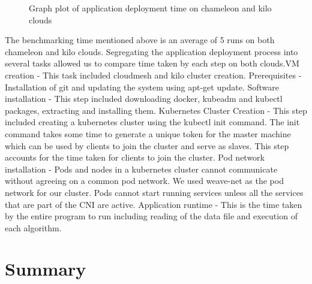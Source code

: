 \documentclass[9pt,twocolumn,twoside]{../../styles/osajnl}
\begin{document}
\begin{figure}[htbp]
\centering
{}
\caption{Graph plot of application deployment time on chameleon and kilo clouds}
\label{Graph plot of application deployment time on chameleon and kilo clouds}
\end{figure}

\noindent
The benchmarking time mentioned above is an average of 5 runs on both
chameleon and kilo clouds. Segregating the application deployment
process into several tasks allowed us to compare time taken by each
step on both clouds.\newline VM creation - This task included
cloudmesh and kilo cluster creation. \newline Prerequisites -
Installation of git and updating the system using apt-get
update. \newline Software installation - This step included
downloading docker, kubeadm and kubectl packages, extracting and
installing them. \newline Kubernetes Cluster Creation - This step
included creating a kubernetes cluster using the kubectl init
command. The init command takes some time to generate a unique token
for the master machine which can be used by clients to join the
cluster and serve as slaves. This step accounts for the time taken for
clients to join the cluster. \newline Pod network installation - Pods
and nodes in a kubernetes cluster cannot communicate without agreeing
on a common pod network. We used weave-net as the pod network for our
cluster. Pods cannot start running services unless all the services
that are part of the CNI are active. \newline Application runtime -
This is the time taken by the entire program to run including reading
of the data file and execution of each algorithm.

\section{Summary}
\end{document}
